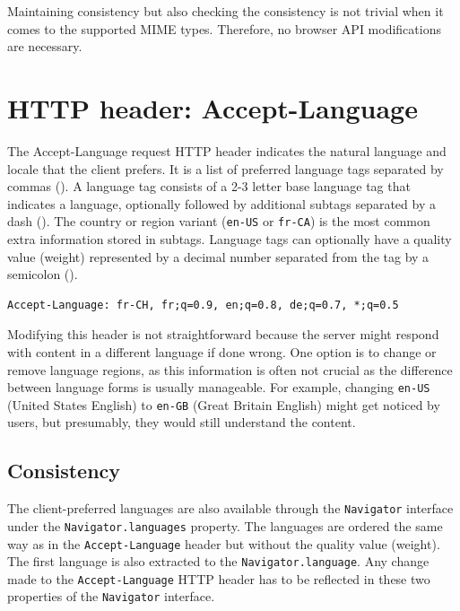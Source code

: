 Maintaining consistency but also checking the consistency is not trivial when it comes to the supported MIME types. Therefore, no browser API modifications are necessary.

\section{HTTP header: Accept-Language}
\label{SectionHTTPHeaderAcceptLanguage}

The Accept-Language request HTTP header \cite{MDNHeaderAcceptLanguage} indicates the natural language and locale that the client prefers. It is a list of preferred language tags separated by commas (\uv{,}). A language tag consists of a 2-3 letter base language tag that indicates a language, optionally followed by additional subtags separated by a dash (\uv{-}). The country or region variant (\texttt{en-US} or \texttt{fr-CA}) is the most common extra information stored in subtags. Language tags can optionally have a quality value (weight) represented by a decimal number separated from the tag by a semicolon (\uv{;}).

\bigbreak

\begin{lstlisting}[caption={An example of Accept-Language header contents \cite{MDNHeaderAcceptLanguage}.}]
Accept-Language: fr-CH, fr;q=0.9, en;q=0.8, de;q=0.7, *;q=0.5
\end{lstlisting}

\medbreak

Modifying this header is not straightforward because the server might respond with content in a different language if done wrong. One option is to change or remove language regions, as this information is often not crucial as the difference between language forms is usually manageable. For example, changing \texttt{en-US} (United States English) to \texttt{en-GB} (Great Britain English) might get noticed by users, but presumably, they would still understand the content.

\subsection{Consistency}

The client-preferred languages are also available through the \texttt{Navigator} interface under the \texttt{Navigator.languages} property. The languages are ordered the same way as in the \texttt{Accept-Language} header but without the quality value (weight). The first language is also extracted to the \texttt{Navigator.language}. Any change made to the \texttt{Accept-Language} HTTP header has to be reflected in these two properties of the \texttt{Navigator} interface.

